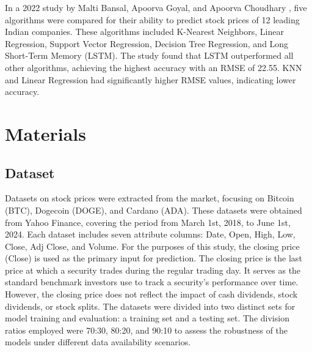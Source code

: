 \documentclass{ieeeojies}
\begin{document}
In a 2022 study by Malti Bansal, Apoorva Goyal, and Apoorva Choudhary \cite{b8}, five algorithms were compared for their ability to predict stock prices of 12 leading Indian companies. These algorithms included K-Nearest Neighbors, Linear Regression, Support Vector Regression, Decision Tree Regression, and Long Short-Term Memory (LSTM). The study found that LSTM outperformed all other algorithms, achieving the highest accuracy with an RMSE of 22.55. KNN and Linear Regression had significantly higher RMSE values, indicating lower accuracy.
\section{Materials}
\subsection{Dataset}
Datasets on stock prices were extracted from the market, focusing on Bitcoin (BTC), Dogecoin (DOGE), and Cardano (ADA). These datasets were obtained from Yahoo Finance, covering the period from March 1st, 2018, to June 1st, 2024. Each dataset includes seven attribute columns: Date, Open, High, Low, Close, Adj Close, and Volume.
For the purposes of this study, the closing price (Close) is used as the primary input for prediction. The closing price is the last price at which a security trades during the regular trading day. It serves as the standard benchmark investors use to track a security's performance over time. However, the closing price does not reflect the impact of cash dividends, stock dividends, or stock splits.
The datasets were divided into two distinct sets for model training and evaluation: a training set and a testing set. The division ratios employed were 70:30, 80:20, and 90:10 to assess the robustness of the models under different data availability scenarios.
\end{document}
